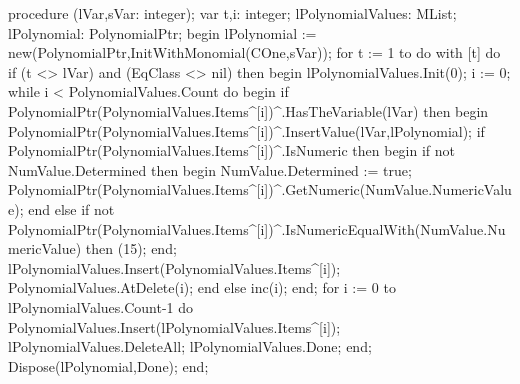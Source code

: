 \nwenddocs{}\plusendmoddef\nwstartdeflinemarkup{}\nwenddeflinemarkup
procedure (lVar,sVar: integer);
var
   t,i: integer;
   lPolynomialValues: MList;
   lPolynomial: PolynomialPtr;
begin
   lPolynomial := new(PolynomialPtr,InitWithMonomial(COne,sVar));
   for t := 1 to  do
      with [t] do
         if (t <> lVar) and (EqClass <> nil) then
         begin
            lPolynomialValues.Init(0);
            i := 0;
            while i < PolynomialValues.Count do
            begin
               if PolynomialPtr(PolynomialValues.Items^[i])^.HasTheVariable(lVar) then
               begin
                  PolynomialPtr(PolynomialValues.Items^[i])^.InsertValue(lVar,lPolynomial);
                  if PolynomialPtr(PolynomialValues.Items^[i])^.IsNumeric then
                  begin
                     if not NumValue.Determined then
                     begin
                        NumValue.Determined := true;
                        PolynomialPtr(PolynomialValues.Items^[i])^.GetNumeric(NumValue.NumericValue);
                     end
                     else if not PolynomialPtr(PolynomialValues.Items^[i])^.IsNumericEqualWith(NumValue.NumericValue) then
                        (15);
                  end;
                  lPolynomialValues.Insert(PolynomialValues.Items^[i]);
                  PolynomialValues.AtDelete(i);
               end else inc(i);
            end;
            for i := 0 to lPolynomialValues.Count-1 do
               PolynomialValues.Insert(lPolynomialValues.Items^[i]);
            lPolynomialValues.DeleteAll;
            lPolynomialValues.Done;
         end;
   Dispose(lPolynomial,Done);
end;

